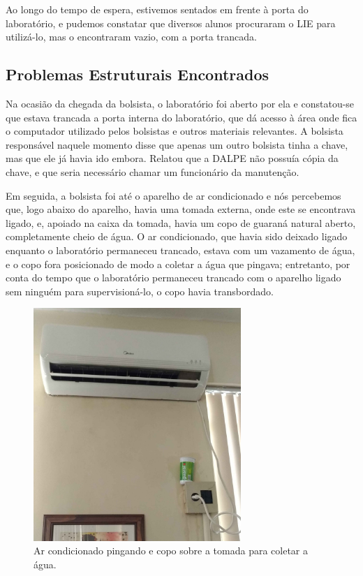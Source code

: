 Ao longo do tempo de espera, estivemos sentados em frente à porta do laboratório, e pudemos constatar que diversos alunos procuraram o LIE para utilizá-lo, mas o encontraram vazio, com a porta trancada.

\subsection{Problemas Estruturais Encontrados}\label{sec:LABEL_CHP_REL_SEC_REL_SUBSEC_PROB}

Na ocasião da chegada da bolsista, o laboratório foi aberto por ela e constatou-se que estava trancada a porta interna do laboratório, que dá acesso à área onde fica o computador utilizado pelos bolsistas e outros materiais relevantes. A bolsista responsável naquele momento disse que apenas um outro bolsista tinha a chave, mas que ele já havia ido embora. Relatou que a DALPE não possuía cópia da chave, e que seria necessário chamar um funcionário da manutenção.

Em seguida, a bolsista foi até o aparelho de ar condicionado e nós percebemos que, logo abaixo do aparelho, havia uma tomada externa, onde este se encontrava ligado, e, apoiado na caixa da tomada, havia um copo de guaraná natural aberto, completamente cheio de água. O ar condicionado, que havia sido deixado ligado enquanto o laboratório permaneceu trancado, estava com um vazamento de água, e o copo fora posicionado de modo a coletar a água que pingava; entretanto, por conta do tempo que o laboratório permaneceu trancado com o aparelho ligado sem ninguém para supervisioná-lo, o copo havia transbordado.

\begin{figure}[ht]
  \centering
  \includegraphics[width=0.7\textwidth]{imagens/copo.jpg}
  \caption{Ar condicionado pingando e copo sobre a tomada para coletar a água.}
  \label{fig:LABEL_FIG_COPO}
\end{figure}

